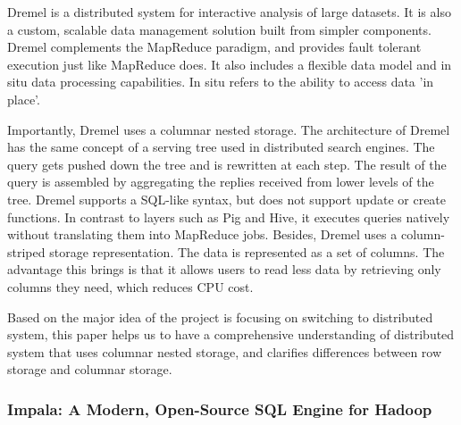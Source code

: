\documentclass[onecolumn, draftclsnofoot,10pt, compsoc]{IEEEtran}
\begin{document}
Dremel is a distributed system for interactive analysis of large datasets. It is also a custom, scalable data management solution built from simpler components. Dremel complements the MapReduce paradigm, and provides fault tolerant execution just like MapReduce does.
It also includes a flexible data model and in situ data processing capabilities.
In situ refers to the ability to access data 'in place'. 

Importantly, Dremel uses a columnar nested storage.
The architecture of Dremel has the same concept of a serving tree used in distributed search engines.
The query gets pushed down the tree and is rewritten at each step. 
The result of the query is assembled by aggregating the replies received from lower levels of the tree.
Dremel supports a SQL-like syntax, but does not support update or create functions. 
In contrast to layers such as Pig and Hive, it executes queries natively without translating them into MapReduce jobs.
Besides, Dremel uses a column-striped storage representation. 
The data is represented as a set of columns. 
The advantage this brings is that it allows users to read less data by retrieving only columns they need, which reduces CPU cost.

Based on the major idea of the project is focusing on switching to distributed system, this paper helps us to have a comprehensive understanding of distributed system that uses columnar nested storage, and clarifies differences between row storage and columnar storage.

\subsubsection{Impala: A Modern, Open-Source SQL Engine for Hadoop}
\end{document}
